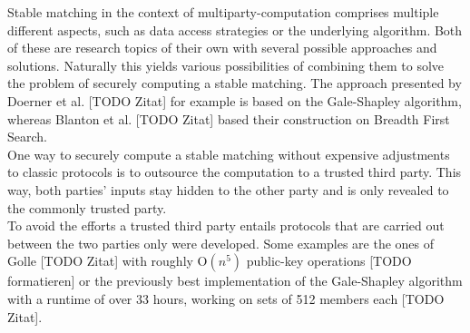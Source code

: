 Stable matching in the context of multiparty-computation comprises multiple different aspects, such as data access strategies or the underlying algorithm. Both of these are research topics of their own with several possible approaches and solutions. Naturally this yields various possibilities of combining them to solve the problem of securely computing a stable matching. The approach presented by Doerner et al. [TODO Zitat] for example is based on the Gale-Shapley algorithm, whereas Blanton et al. [TODO Zitat] based their construction on Breadth First Search.\\
One way to securely compute a stable matching without expensive adjustments to classic protocols is to outsource the computation to a trusted third party. This way, both parties' inputs stay hidden to the other party and is only revealed to the commonly trusted party.\\
To avoid the efforts a trusted third party entails protocols that are carried out between the two parties only were developed. Some examples are the ones of Golle [TODO Zitat] with roughly O$(n^5)$ public-key operations [TODO formatieren] or the previously best implementation of the Gale-Shapley algorithm with a runtime of over 33 hours, working on sets of 512 members each [TODO Zitat].